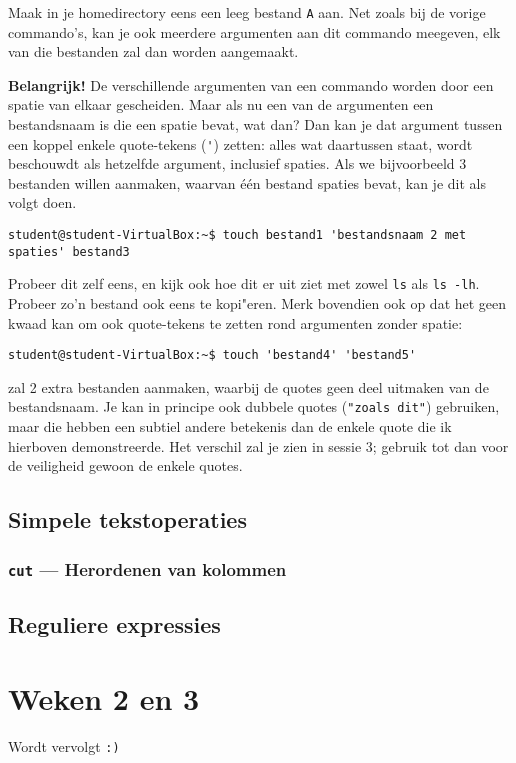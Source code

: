 \documentclass[a4paper,twoside,openany]{memoir}
\begin{document}
Maak in je homedirectory eens een leeg bestand \verb!A! aan. Net zoals bij de vorige commando's, kan je ook meerdere argumenten aan dit commando meegeven, elk van die bestanden zal dan worden aangemaakt.

\textbf{Belangrijk!} De verschillende argumenten van een commando worden door een spatie van elkaar gescheiden. Maar als nu een van de argumenten een bestandsnaam is die een spatie bevat, wat dan? Dan kan je dat argument tussen een koppel enkele quote-tekens (\verb!'!) zetten: alles wat daartussen staat, wordt beschouwdt als hetzelfde argument, inclusief spaties. Als we bijvoorbeeld 3 bestanden willen aanmaken, waarvan \'e\'en bestand spaties bevat, kan je dit als volgt doen.

\begin{verbatim}
student@student-VirtualBox:~$ touch bestand1 'bestandsnaam 2 met spaties' bestand3
\end{verbatim}

Probeer dit zelf eens, en kijk ook hoe dit er uit ziet met zowel \verb!ls! als \verb!ls -lh!. Probeer zo'n bestand ook eens te kopi"eren. Merk bovendien ook op dat het geen kwaad kan om ook quote-tekens te zetten rond argumenten zonder spatie:

\begin{verbatim}
student@student-VirtualBox:~$ touch 'bestand4' 'bestand5'
\end{verbatim}

zal 2 extra bestanden aanmaken, waarbij de quotes geen deel uitmaken van de bestandsnaam. Je kan in principe ook dubbele quotes (\verb!"zoals dit"!) gebruiken, maar die hebben een subtiel andere betekenis dan de enkele quote die ik hierboven demonstreerde. Het verschil zal je zien in sessie 3; gebruik tot dan voor de veiligheid gewoon de enkele quotes.

\chapter{Simpele tekstoperaties}

\section{\texttt{cut} --- Herordenen van kolommen}


\chapter{Reguliere expressies}

\part{Weken 2 en 3}
Wordt vervolgt \verb!:)!
\end{document}
